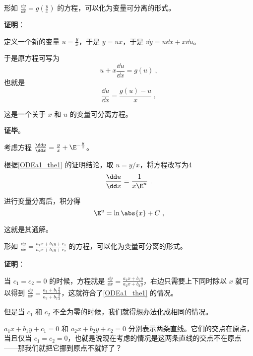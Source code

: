 \begin{theorem}{}\label{ODEa1_the1}
形如 $\frac{\dd y}{\dd x}=g(\frac{y}{x})$ 的方程，可以化为变量可分离的形式。
\end{theorem}

\textbf{证明}：

定义一个新的变量 $u=\frac{y}{x}$，于是 $y=ux$，于是 $\dd y=u\dd x+x\dd u$。

于是原方程可写为
\begin{equation}
u+x\frac{\dd u}{\dd x}=g(u)~,
\end{equation}
也就是
\begin{equation}
\frac{\dd u}{\dd x}=\frac{g(u)-u}{x}~,
\end{equation}

这是一个关于 $x$ 和 $u$ 的变量可分离方程。

\textbf{证毕}。

\begin{example}{}
考虑方程 $\frac{\dd y}{\dd x}=\frac{y}{x}+\E^{-\frac{y}{x}}$。

根据\autoref{ODEa1_the1} 的证明结论，取 $u=y/x$，将方程改写为4
\begin{equation}
\frac{\dd u}{\dd x}=\frac{1}{x\E^u}~.
\end{equation}

进行变量分离后，积分得
\begin{equation}
\E^u=\ln\abs{x}+C~,
\end{equation}

这就是其通解。


\end{example}


\begin{corollary}{}\label{ODEa1_cor1}
形如 $\frac{\dd y}{\dd x}=\frac{a_1x+b_1y+c_1}{a_2x+b_2y+c_2}$ 的方程，可以化为变量可分离的形式。
\end{corollary}

\textbf{证明}：

当 $c_1=c_2=0$ 的时候，方程就是 $\frac{\dd y}{\dd x}=\frac{a_1x+b_1y}{a_2x+b_2y}$，右边只需要上下同时除以 $x$ 就可以得到 $\frac{\dd y}{\dd x}=\frac{a_1+b_1\frac{y}{x}}{a_2+b_2\frac{y}{x}}$，这就符合了\autoref{ODEa1_the1} 的情况。

但是当 $c_1$ 和 $c_2$ 不全为零的时候，我们就得想办法化成相同的情况。

$a_1x+b_1y+c_1=0$ 和 $a_2x+b_2y+c_2=0$ 分别表示两条直线。它们的交点在原点，当且仅当 $c_1=c_2=0$，也就是说现在考虑的情况是这两条直线的交点不在原点——那我们就把它挪到原点不就好了？

